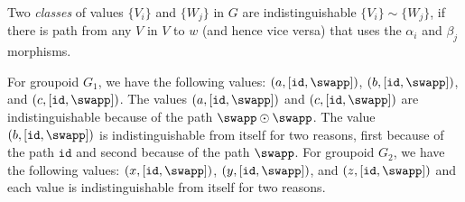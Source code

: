 \begin{definition}[Distinguishability] Two \emph{classes} of values
  $\{V_i\}$ and $\{W_j\}$ in $G$ are indistinguishable $\{V_i\} \sim \{W_j\}$,
  if there is path from any $V$ in $V$ to $w$ (and hence vice versa) that uses
  the $\alpha_i$ and $\beta_j$ morphisms.
\end{definition}

For groupoid $G_1$, we have the following values:
$(a,[\texttt{id},\swapp])$, $(b,[\texttt{id},\swapp])$, and
$(c,[\texttt{id},\swapp])$. The values $(a,[\texttt{id},\swapp])$ and
$(c,[\texttt{id},\swapp])$ are indistinguishable because of the path
$\swapp\odot\swapp$. The value $(b,[\texttt{id},\swapp])$ is
indistinguishable from itself for two reasons, first because of the
path $\texttt{id}$ and second because of the path $\swapp$. For
groupoid $G_2$, we have the following values:
$(x,[\texttt{id},\swapp])$, $(y,[\texttt{id},\swapp])$, and
$(z,[\texttt{id},\swapp])$ and each value is indistinguishable from
itself for two reasons.















